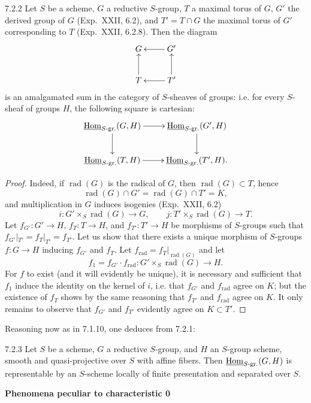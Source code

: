 \begin{lemma}{7.2.2}\label{XXIV.7.2.2}
Let $S$ be a scheme, $G$ a reductive $S$-group, $T$ a maximal torus of $G$, $G'$ the derived group of $G$ (Exp.~XXII, 6.2), and $T'=T\cap G$ the maximal torus of $G'$ corresponding to $T$ (Exp.~XXII, 6.2.8). Then the diagram
\[
\xymatrix{G&G'\ar[l]\\T\ar[u]&T'\ar[l]\ar[u]}
\]
is an amalgamated sum in the category of $S$-sheaves of groups: i.e. for every $S$-sheaf of groups $H$, the following square is cartesian:
\[
\xymatrix{\underline{\Hom}_{S\text{-gr.}}(G,H)\ar[r]\ar[d]&\underline{\Hom}_{S\text{-gr.}}(G',H)\ar[d]\\
\underline{\Hom}_{S\text{-gr.}}(T,H)\ar[r]&\underline{\Hom}_{S\text{-gr.}}(T',H).}
\]
\end{lemma}
\begin{proof}
Indeed, if $\operatorname{rad}(G)$ is the radical of $G$, then $\operatorname{rad}(G)\subset T$, hence
\[
\operatorname{rad}(G)\cap G'=\operatorname{rad}(G)\cap T'=K,
\]
and multiplication in $G$ induces isogenies (Exp.~XXII, 6.2)
\[
i:G'\times_S\operatorname{rad}(G)\to G,\qquad j:T'\times_S\operatorname{rad}(G)\to T.
\]
Let $f_{G'}:G'\to H$, $f_T:T\to H$, and $f_{T'}:T'\to H$ be morphisms of $S$-groups such that $f_{G'}|_{T'}=f_T|_{T'}=f_{T'}$. Let us show that there exists a unique morphism of $S$-groups $f:G\to H$ inducing $f_{G'}$ and $f_T$. Let $f_{\mathrm{rad}}=f_T|_{\operatorname{rad}(G)}$ and let
\[
f_1=f_{G'}\cdot f_{\mathrm{rad}}:G'\times_S\operatorname{rad}(G)\to H.
\]
For $f$ to exist (and it will evidently be unique), it is necessary and sufficient that $f_1$ induce the identity on the kernel of $i$, i.e. that $f_{G'}$ and $f_{\mathrm{rad}}$ agree on $K$; but the existence of $f_T$ shows by the same reasoning that $f_{T'}$ and $f_{\mathrm{rad}}$ agree on $K$. It only remains to observe that $f_{G'}$ and $f_{T'}$ evidently agree on $K\subset T'$.
\end{proof}
Reasoning now as in 7.1.10, one deduces from 7.2.1:
\begin{corollary}{7.2.3}\label{XXIV.7.2.3}
Let $S$ be a scheme, $G$ a reductive $S$-group, and $H$ an $S$-group scheme, smooth and quasi-projective over $S$ with affine fibers. Then $\underline{\operatorname{Hom}}_{S\text{-gr.}}(G,H)$ is representable by an $S$-scheme locally of finite presentation and separated over $S$.
\end{corollary}
\label{XXIV.7.3}\textbf{Phenomena peculiar to characteristic 0}
